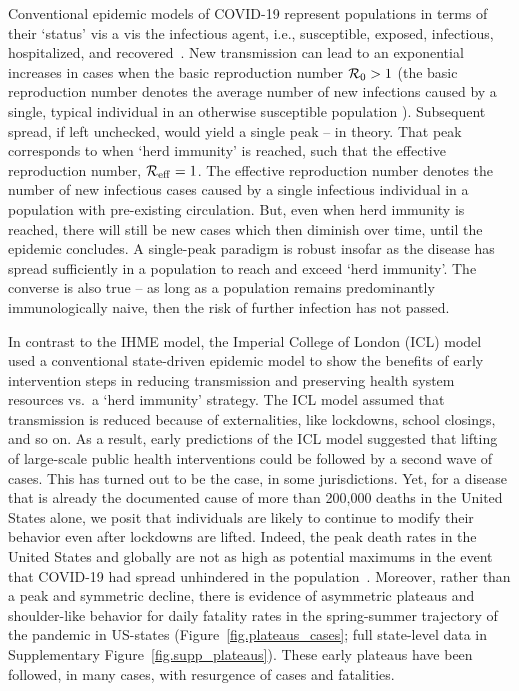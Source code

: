 Conventional epidemic
models of COVID-19 represent populations in terms of their `status' vis
a vis the infectious agent, i.e., susceptible, exposed, infectious,
hospitalized, and recovered~\citep{ferguson2020report,kucharski2020early,kissler_medrxiv2020,park_medrxiv2020,kraemer_2020sci,li_science2020,wu_2020natmed}.
New transmission can lead to an exponential increases in cases 
when the basic reproduction number ${\cal{R}}_0>1$ (the
basic reproduction number denotes the average number of new
infections caused by a single, typical individual in an otherwise
susceptible population \citep{anderson1991infectious}).  Subsequent
spread, if left unchecked, would yield a single peak -- in theory. That 
peak corresponds to when `herd immunity' is reached, such
that the effective reproduction number, ${\cal{R}}_{\mathrm{eff}}=1$.
The effective reproduction number denotes the number of new
infectious cases caused by a single infectious individual
in a population with pre-existing circulation.
But, even when herd immunity is reached, there will still be new cases 
which then diminish over time, until the epidemic concludes.  
A single-peak paradigm is
robust insofar as the disease has spread
sufficiently in a population to reach and exceed `herd immunity'.
The converse
is also true  -- as long as 
a population remains predominantly immunologically
naive, then the risk of further infection has not passed. 

In contrast to the IHME model,
the Imperial College of London (ICL) model~\citep{ferguson2020report} 
used a conventional state-driven epidemic model
to show the benefits of  early intervention steps in reducing
transmission and preserving health system resources vs.~a `herd immunity' strategy.  
The ICL model assumed that
transmission is reduced because of externalities, like lockdowns,
school closings, and so on.  
As a result, early predictions of the ICL model suggested that lifting of large-scale
public health interventions could be followed by a second wave of cases.
This has turned out to be the case, in some jurisdictions.
Yet, for a disease
that is already the documented cause of more than 200,000 deaths
in the United States alone, we posit that individuals
are likely to continue to modify
their behavior even after lockdowns are lifted.  
Indeed, the peak death rates in the United States and globally
are not as high as potential maximums in the event that
COVID-19 had spread unhindered in the population~\citep{ferguson2020report}. 
Moreover, rather than a peak and symmetric decline, there is evidence 
of asymmetric plateaus and shoulder-like
behavior for daily fatality rates in the spring-summer
trajectory of the pandemic in US-states
(Figure~\ref{fig.plateaus_cases}; full state-level data in Supplementary
Figure~\ref{fig.supp_plateaus}).  These early plateaus have
been followed, in many cases, with resurgence of cases and fatalities.  

